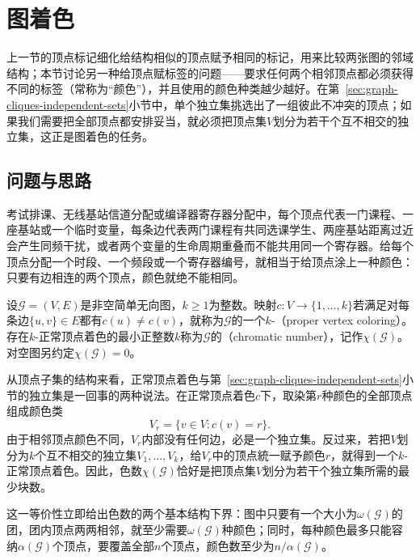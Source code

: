 \section{图着色}
\label{sec:graph-coloring}

上一节的顶点标记细化给结构相似的顶点赋予相同的标记，用来比较两张图的邻域结构；本节讨论另一种给顶点赋标签的问题——要求任何两个相邻顶点都必须获得不同的标签（常称为“颜色”），并且使用的颜色种类越少越好。在第~\ref{sec:graph-cliques-independent-sets}小节中，单个独立集挑选出了一组彼此不冲突的顶点；如果我们需要把全部顶点都安排妥当，就必须把顶点集$V$划分为若干个互不相交的独立集，这正是图着色的任务。

\subsection{问题与思路}
\label{sec:graph-coloring-problem}

考试排课、无线基站信道分配或编译器寄存器分配中，每个顶点代表一门课程、一座基站或一个临时变量，每条边代表两门课程有共同选课学生、两座基站距离过近会产生同频干扰，或者两个变量的生命周期重叠而不能共用同一个寄存器。给每个顶点分配一个时段、一个频段或一个寄存器编号，就相当于给顶点涂上一种颜色：只要有边相连的两个顶点，颜色就绝不能相同。

\begin{definition}[正常顶点着色与色数]
\label{def:graph-vertex-coloring}
设$\mathcal G=(V,E)$是非空简单无向图，$k\geq 1$为整数。映射$c:V\to\{1,\ldots,k\}$若满足对每条边$\{u,v\}\in E$都有$c(u)\neq c(v)$，就称为$\mathcal G$的一个$k$-（proper vertex coloring）。存在$k$-正常顶点着色的最小正整数$k$称为$\mathcal G$的（chromatic number），记作$\chi(\mathcal G)$。对空图另约定$\chi(\mathcal G)=0$。
\end{definition}

从顶点子集的结构来看，正常顶点着色与第~\ref{sec:graph-cliques-independent-sets}小节的独立集是一回事的两种说法。在正常顶点着色$c$下，取染第$r$种颜色的全部顶点组成颜色类
\[
V_r=\bigl\{v\in V:c(v)=r\bigr\}.
\]
由于相邻顶点颜色不同，$V_r$内部没有任何边，必是一个独立集。反过来，若把$V$划分为$k$个互不相交的独立集$V_1,\ldots,V_k$，给$V_r$中的顶点統一赋予颜色$r$，就得到一个$k$-正常顶点着色。因此，色数$\chi(\mathcal G)$恰好是把顶点集$V$划分为若干个独立集所需的最少块数。

这一等价性立即给出色数的两个基本结构下界：图中只要有一个大小为$\omega(\mathcal G)$的团，团内顶点两两相邻，就至少需要$\omega(\mathcal G)$种颜色；同时，每种颜色最多只能容纳$\alpha(\mathcal G)$个顶点，要覆盖全部$n$个顶点，颜色数至少为$n/\alpha(\mathcal G)$。

